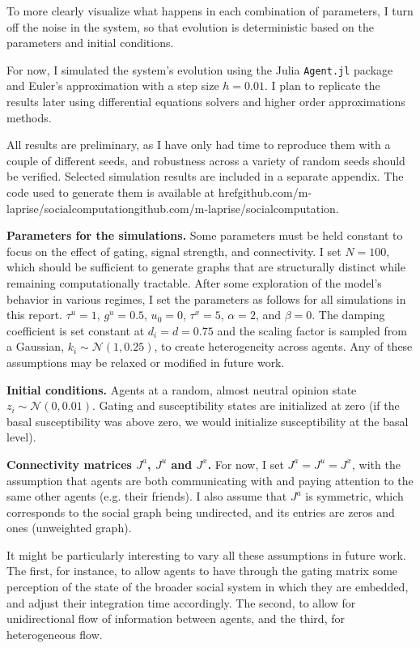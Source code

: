 \documentclass[]{article}
\begin{document}
To more clearly visualize what happens in each combination of parameters, I turn off the noise in the system, so that evolution is deterministic based on the parameters and initial conditions.

For now, I simulated the system's evolution using the Julia \texttt{Agent.jl} package and Euler's approximation with a step size $h = 0.01$. I plan to replicate the results later using differential equations solvers and higher order approximations methods.

All results are preliminary, as I have only had time to reproduce them with a couple of different seeds, and robustness across a variety of random seeds should be verified. Selected simulation results are included in a separate appendix. The code used to generate them is available at href{github.com/m-laprise/socialcomputation}{github.com/m-laprise/socialcomputation}.

\textbf{Parameters for the simulations.} Some parameters must be held constant to focus on the effect of gating, signal strength, and connectivity. I set $N = 100$, which should be sufficient to generate graphs that are structurally distinct while remaining computationally tractable. After some exploration of the model's behavior in various regimes, I set the parameters as follows for all simulations in this report. $\tau^u = 1$, $g^u = 0.5$, $u_0=0$, $\tau^x = 5$, $\alpha = 2$, and $\beta = 0$. The damping coefficient is set constant at $d_i = d = 0.75$ and the scaling factor is sampled from a Gaussian, $k_i \sim \mathcal{N}(1,0.25)$, to create heterogeneity across agents. Any of these assumptions may be relaxed or modified in future work. 


\textbf{Initial conditions.} Agents at a random, almost neutral opinion state $z_i \sim \mathcal{N}(0, 0.01)$. Gating and susceptibility states are initialized at zero (if the basal susceptibility was above zero, we would initialize susceptibility at the basal level).

\textbf{Connectivity matrices $J^a$, $J^u$ and $J^x$.} For now, I set $J^a = J^u = J^x$, with the assumption that agents are both communicating with and paying attention to the same other agents (e.g. their friends). I also assume that $J^a$ is symmetric, which corresponds to the social graph being undirected, and its entries are zeros and ones (unweighted graph).

It might be particularly interesting to vary all these assumptions in future work. The first, for instance, to allow agents to have through the gating matrix some perception of the state of the broader social system in which they are embedded, and adjust their integration time accordingly. The second, to allow for unidirectional flow of information between agents, and the third, for heterogeneous flow.
\end{document}
